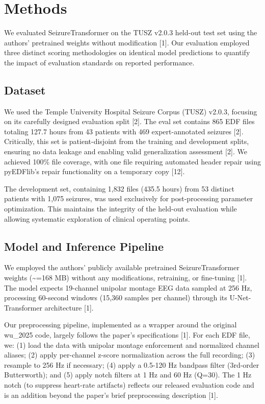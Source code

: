 \documentclass[
]{article}
\begin{document}
\hypertarget{methods}{%
\section{Methods}\label{methods}}

We evaluated SeizureTransformer on the TUSZ v2.0.3 held-out test set
using the authors' pretrained weights without modification {[}1{]}. Our
evaluation employed three distinct scoring methodologies on identical
model predictions to quantify the impact of evaluation standards on
reported performance.

\hypertarget{dataset}{%
\subsection{Dataset}\label{dataset}}

We used the Temple University Hospital Seizure Corpus (TUSZ) v2.0.3,
focusing on its carefully designed evaluation split {[}2{]}. The eval
set contains 865 EDF files totaling 127.7 hours from 43 patients with
469 expert-annotated seizures {[}2{]}. Critically, this set is
patient-disjoint from the training and development splits, ensuring no
data leakage and enabling valid generalization assessment {[}2{]}. We
achieved 100\% file coverage, with one file requiring automated header
repair using pyEDFlib's repair functionality on a temporary copy
{[}12{]}.

The development set, containing 1,832 files (435.5 hours) from 53
distinct patients with 1,075 seizures, was used exclusively for
post-processing parameter optimization. This maintains the integrity of
the held-out evaluation while allowing systematic exploration of
clinical operating points.

\hypertarget{model-and-inference-pipeline}{%
\subsection{Model and Inference
Pipeline}\label{model-and-inference-pipeline}}

We employed the authors' publicly available pretrained
SeizureTransformer weights (\textasciitilde=168 MB) without any
modifications, retraining, or fine-tuning {[}1{]}. The model expects
19-channel unipolar montage EEG data sampled at 256 Hz, processing
60-second windows (15,360 samples per channel) through its
U-Net-Transformer architecture {[}1{]}.

Our preprocessing pipeline, implemented as a wrapper around the original
wu\_2025 code, largely follows the paper's specifications {[}1{]}. For
each EDF file, we: (1) load the data with unipolar montage enforcement
and normalized channel aliases; (2) apply per-channel z-score
normalization across the full recording; (3) resample to 256 Hz if
necessary; (4) apply a 0.5-120 Hz bandpass filter (3rd-order
Butterworth); and (5) apply notch filters at 1 Hz and 60 Hz (Q=30). The
1 Hz notch (to suppress heart-rate artifacts) reflects our released
evaluation code and is an addition beyond the paper's brief
preprocessing description {[}1{]}.
\end{document}
